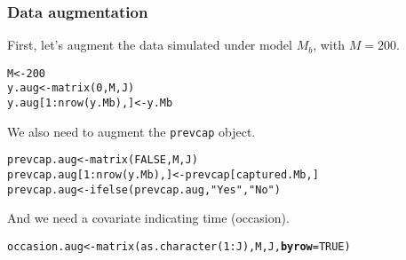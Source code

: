\documentclass[color=usenames,dvipsnames]{beamer}\usepackage[]{graphicx}\usepackage[]{xcolor}
\makeatletter
\newcommand{\hlnum}[1]{\textcolor[rgb]{0.69,0.494,0}{#1}}%
\newcommand{\hlsng}[1]{\textcolor[rgb]{0.749,0.012,0.012}{#1}}%
\newcommand{\hlopt}[1]{\textcolor[rgb]{0,0,0}{#1}}%
\newcommand{\hldef}[1]{\textcolor[rgb]{0,0,0}{#1}}%
\newcommand{\hlkwb}[1]{\textcolor[rgb]{0,0.341,0.682}{#1}}%
\newcommand{\hlkwc}[1]{\textcolor[rgb]{0,0,0}{\textbf{#1}}}%
\newcommand{\hlkwd}[1]{\textcolor[rgb]{0.004,0.004,0.506}{#1}}%
\newenvironment{kframe}{%
 \def\at@end@of@kframe{}%
 \ifinner\ifhmode%
  \def\at@end@of@kframe{\end{minipage}}%
  \begin{minipage}{\columnwidth}%
 \fi\fi%
 \def\FrameCommand##1{\hskip\@totalleftmargin \hskip-\fboxsep
 \colorbox{shadecolor}{##1}\hskip-\fboxsep
     \hskip-\linewidth \hskip-\@totalleftmargin \hskip\columnwidth}%
 \MakeFramed {\advance\hsize-\width
   \@totalleftmargin\z@ \linewidth\hsize
   \@setminipage}}%
 {\par\unskip\endMakeFramed%
 \at@end@of@kframe}
\newenvironment{knitrout}{}{} %
\newcommand{\inr}[1]{\colorbox{inlinecolor}{\texttt{#1}}}
\makeatother
\begin{document}
\begin{frame}[fragile]
  \frametitle{Data augmentation}
  First, let's augment the data simulated under model $M_b$, with
  $M=200$. \\
\begin{knitrout}\scriptsize
{}\color{fgcolor}\begin{kframe}
\begin{alltt}
\hldef{M} \hlkwb{<-} \hlnum{200}
\hldef{y.aug} \hlkwb{<-} \hlkwd{matrix}\hldef{(}\hlnum{0}\hldef{, M, J)}
\hldef{y.aug[}\hlnum{1}\hlopt{:}\hlkwd{nrow}\hldef{(y.Mb),]} \hlkwb{<-} \hldef{y.Mb}
\end{alltt}
\end{kframe}
\end{knitrout}
\pause
\vfill
We also need to augment the \inr{prevcap} object. \\
\begin{knitrout}\scriptsize
{}\color{fgcolor}\begin{kframe}
\begin{alltt}
\hldef{prevcap.aug} \hlkwb{<-} \hlkwd{matrix}\hldef{(}\hlnum{FALSE}\hldef{, M, J)}
\hldef{prevcap.aug[}\hlnum{1}\hlopt{:}\hlkwd{nrow}\hldef{(y.Mb),]} \hlkwb{<-} \hldef{prevcap[captured.Mb,]}
\hldef{prevcap.aug} \hlkwb{<-} \hlkwd{ifelse}\hldef{(prevcap.aug,} \hlsng{"Yes"}\hldef{,} \hlsng{"No"}\hldef{)}
\end{alltt}
\end{kframe}
\end{knitrout}
\pause
\vfill
And we need a covariate indicating time (occasion). \\
\begin{knitrout}\scriptsize
{}\color{fgcolor}\begin{kframe}
\begin{alltt}
\hldef{occasion.aug} \hlkwb{<-} \hlkwd{matrix}\hldef{(}\hlkwd{as.character}\hldef{(}\hlnum{1}\hlopt{:}\hldef{J), M, J,} \hlkwc{byrow}\hldef{=}\hlnum{TRUE}\hldef{)}
\end{alltt}
\end{kframe}
\end{knitrout}
\end{frame}
\end{document}
